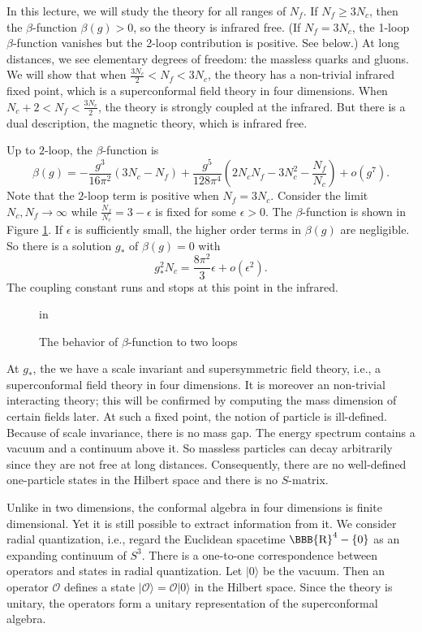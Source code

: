 \documentclass[lecture]{qft-l}
\newcommand{\eps}{\epsilon}
\newcommand{\RE}{{\mbox{\BBB{R}}}}
\newcommand{\bef}{\begin{figure}[h]
		\vspace{3ex}}
\newcommand{\enf}{\end{figure}}
\newcommand{\ket}{\rangle}
\newcommand{\OO}{{\mathcal O}}
\numberwithin{figure}{chapter}
\begin{document}
In this lecture, we will study the theory for all ranges of $N_f$.
If $N_f\ge3N_c$, then the $\beta$-function $\beta(g)>0$, 
so the theory is infrared free.
(If $N_f=3N_c$, the 1-loop $\beta$-function vanishes but the 2-loop 
contribution is positive. See below.)
At long distances, we see elementary degrees of freedom:
the massless quarks and gluons.
We will show that when $\frac{3N_c}{2}<N_f<3N_c$, the theory has 
a non-trivial infrared fixed point, which is a superconformal field theory
in four dimensions.
When $N_c+2<N_f<\frac{3N_c}{2}$, the theory is strongly coupled at the 
infrared.
But there is a dual description, the magnetic 
theory, which is infrared free.


Up to $2$-loop, the $\beta$-function is
\begin{equation}
\beta(g)=-\frac{g^3}{16\pi^2}(3N_c-N_f)+
\frac{g^5}{128\pi^4}\left(2N_cN_f-3N_c^2-\frac{N_f}{N_c}\right)
+o(g^7).
\end{equation}
Note that the $2$-loop term is positive when $N_f=3N_c$.
Consider the limit $N_c,N_f\to\infty$ while $\frac{N_f}{N_c}=3-\eps$
is fixed for some $\eps>0$.
The $\beta$-function is shown in Figure \ref{BETA}.
If $\eps$ is sufficiently small, the higher order terms in $\beta(g)$ 
are negligible.
So there is a solution $g_*$ of $\beta(g)=0$ with
	\begin{equation}\label{gstar}
g_*^2N_c=\frac{8\pi^2}{3}\eps+o(\eps^2).
	\end{equation}
The coupling constant runs and stops at this point in the infrared.

	\bef
{} in
\centerline{}
\caption{\protect\label{BETA}The behavior of $\beta$-function to two loops}
	\enf

At $g_*$, the we have a scale invariant and supersymmetric field theory,
i.e., a superconformal field theory in four dimensions.
It is moreover an non-trivial interacting theory;
this will be confirmed by computing the mass dimension of certain fields later.
At such a fixed point, the notion of particle is ill-defined.
Because of scale invariance, there is no mass gap.
The energy spectrum contains a vacuum and a continuum above it.
So massless particles can decay arbitrarily since they are not free 
at long distances.
Consequently, there are no well-defined one-particle states in the Hilbert 
space and there is no $S$-matrix.

Unlike in two dimensions, the conformal algebra in four dimensions 
is finite dimensional.
Yet it is still possible to extract information from it.
We consider radial quantization, i.e., regard the Euclidean spacetime
$\RE^4-\{0\}$ as an expanding continuum of $S^3$.
There is a one-to-one correspondence between operators and states in
radial quantization.
Let $|0\ket$ be the vacuum.
Then an operator $\OO$ defines a state $|\OO\ket=\OO|0\ket$ in the Hilbert
space.
Since the theory is unitary, the operators form a unitary representation
of the superconformal algebra.
\end{document}
